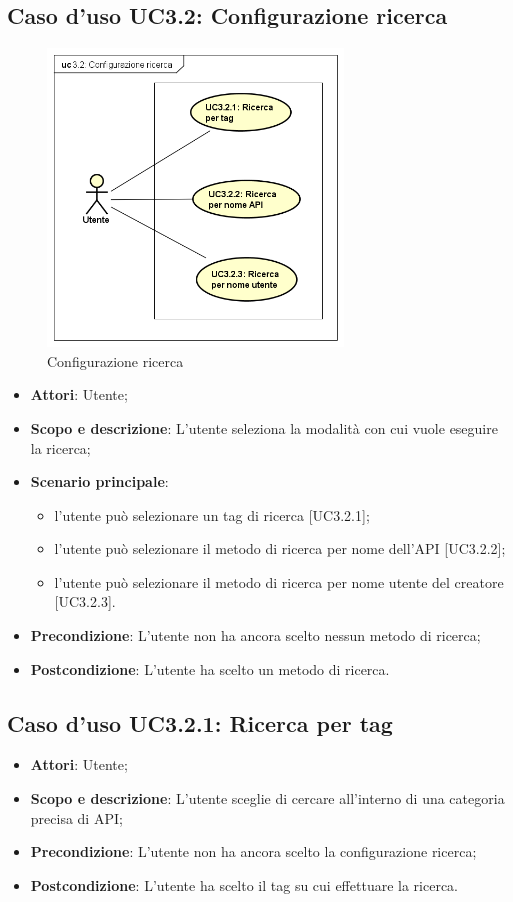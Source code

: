 \documentclass[12pt,a4paper,titlepage]{article}
\begin{document}
	\subsection{Caso d'uso UC3.2: Configurazione ricerca}
	\label{UC3.2}
	\begin{figure}[H]
		\centering
		\includegraphics[width=0.7\textwidth]{UseCase/ConfigurazioneRicerca}
		\caption{Configurazione ricerca}
	\end{figure}
	\begin{itemize}
		\item \textbf{Attori}: Utente;
		\item \textbf{Scopo e descrizione}: L'utente seleziona la modalità con cui vuole eseguire la ricerca;
		\item \textbf{Scenario principale}:
			\begin{itemize}
				\item l'utente può selezionare un tag di ricerca [UC3.2.1];
				\item l'utente può selezionare il metodo di ricerca per nome dell'API [UC3.2.2];
				\item l'utente può selezionare il metodo di ricerca per nome utente del creatore [UC3.2.3].
			\end{itemize}
		\item \textbf{Precondizione}: L'utente non ha ancora scelto nessun metodo di ricerca;
		\item \textbf{Postcondizione}: L'utente ha scelto un metodo di ricerca.
	\end{itemize}
	\subsection{Caso d'uso UC3.2.1: Ricerca per tag}
	\label{UC3.2.1}
	\begin{itemize}
		\item \textbf{Attori}: Utente;
		\item \textbf{Scopo e descrizione}: L'utente sceglie di cercare all'interno di una categoria precisa di API;
		\item \textbf{Precondizione}: L'utente non ha ancora scelto la configurazione ricerca;
		\item \textbf{Postcondizione}: L'utente ha scelto il tag su cui effettuare la ricerca.
	\end{itemize}
\end{document}

